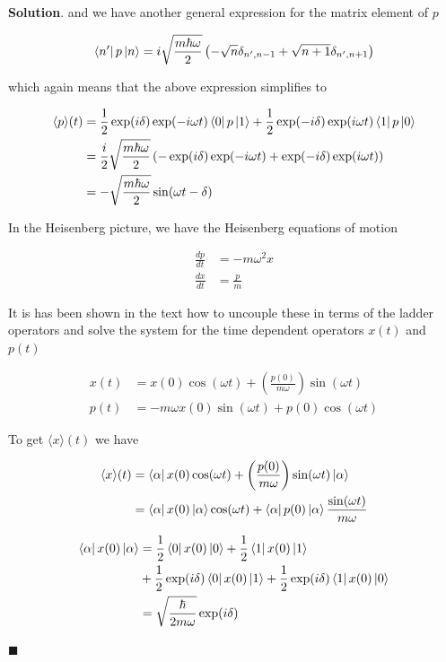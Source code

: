 \documentclass[12pt]{article}
\theoremstyle{definition}
\newenvironment{s}{%
        \begin{trivlist} \item \textbf{Solution}. }{%
            \hspace*{\fill} $\blacksquare$\end{trivlist}}%
\begin{document}
{\begin{s}
and we have another general expression for the matrix element of $p$

\begin{align*}
\bra{n'}p\ket{n} = i\sqrt{\frac{m\hbar\omega}{2}}\left(-\sqrt{n}\delta_{n',n-1} +\sqrt{n+1}\delta_{n',n+1}\right)
\end{align*}

which again means that the above expression simplifies to 

\begin{align*}
\langle p\rangle(t) &= \frac{1}{2}\exp(i\delta)\exp(-i\omega t)\bra{0}p\ket{1} + \frac{1}{2}\exp(-i\delta)\exp(i\omega t)\bra{1}p\ket{0}\\
&= \frac{i}{2}\sqrt{\frac{m\hbar\omega}{2}}\left(-\exp(i\delta)\exp(-i\omega t)+\exp(-i\delta)\exp(i\omega t)\right)\\
&= -\sqrt{\frac{m\hbar\omega}{2}}\sin(\omega t - \delta)
\end{align*}

In the Heisenberg picture, we have the Heisenberg equations of motion

\begin{align*}
\frac{dp}{dt} &= -m\omega^{2}x\\
\frac{dx}{dt} &= \frac{p}{m}
\end{align*}

It is has been shown in the text how to uncouple these in terms of the ladder operators and solve the system for the time dependent operators $x(t)$ and $p(t)$

\begin{align*}
x(t) &= x(0)\cos(\omega t) + \left(\frac{p(0)}{m\omega}\right)\sin(\omega t)\\
p(t) &= -m\omega x(0)\sin(\omega t) + p(0)\cos(\omega t)
\end{align*}

To get $\langle x \rangle (t)$ we have

\begin{align*}
\langle x \rangle (t) &= \bra{\alpha} x(0)\cos(\omega t) + \left(\frac{p(0)}{m\omega}\right)\sin(\omega t) \ket{\alpha}\\
&= \bra{\alpha}x(0)\ket{\alpha}\cos(\omega t) + \bra{\alpha} p(0)\ket{\alpha}\frac{\sin(\omega t)}{m\omega}
\end{align*}

\begin{align*}
\bra{\alpha}x(0)\ket{\alpha} &= \frac{1}{2}\bra{0}x(0)\ket{0} + \frac{1}{2}\bra{1}x(0)\ket{1} \\
&+ \frac{1}{2}\exp(i\delta)\bra{0}x(0)\ket{1}+ \frac{1}{2}\exp(i\delta)\bra{1}x(0)\ket{0}\\
&= \sqrt{\frac{\hbar}{2m\omega}}\exp(i\delta)
\end{align*}


\end{s}}
\end{document}
